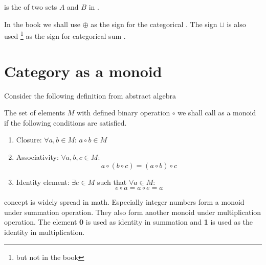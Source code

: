 \begin{example}
  \label{ex:set_sum}
   is the  of two sets $A$ and $B$ in
  .  
\end{example}

\begin{remark}
In the book we shall use $\oplus$ as the sign for the categorical
. The  sign $\sqcup$
is also used
\footnote{but not in the book} as the sign for categorical sum
\cite{wiki:coproduct}. 
\end{remark}

\section{Category as a monoid}
\label{sec:category_as_monoid}
Consider the following definition from abstract algebra
\begin{definition}[Monoid]
  \label{def:monoid}
  The set of elements $M$ with defined binary operation $\circ$ we shall call
  as a monoid if the following conditions are satisfied.
  \begin{enumerate}
  \item Closure: $\forall a, b \in M$: $a \circ b \in M$
  \item Associativity: $\forall a, b, c \in M:$ 
    \begin{equation}
      \label{eq:monoid_associativity}
      a \circ \left( b \circ c \right) =
      \left( a \circ b \right) \circ c
    \end{equation}
  \item Identity element: $\exists e \in M$ such that $\forall a \in M$:
    \begin{equation}
      \label{eq:monoid_identity_element}
      e \circ a = a \circ e = a
    \end{equation}    
  \end{enumerate}
\end{definition}

\begin{example}[Monoid]
 concept is widely spread in math. Especially
integer numbers form a monoid under summation operation. They also
form another monoid under multiplication operation. The element
\textbf{0} is used as identity in summation and \textbf{1} is used as
the identity in multiplication. 
\end{example}

